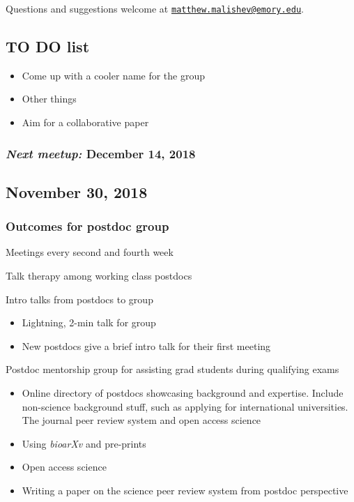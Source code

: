 \documentclass[10,portrait]{article}
\providecommand{\tightlist}{%
  \setlength{\itemsep}{0pt}\setlength{\parskip}{0pt}}
\begin{document}
Questions and suggestions welcome at
\href{mailto:matthew.malishev@emory.edu}{\nolinkurl{matthew.malishev@emory.edu}}.

\newpage  

\subsection{TO DO list}\label{to-do-list}

\begin{itemize}
\tightlist
\item
  Come up with a cooler name for the group\\
\item
  Other things\\
\item
  Aim for a collaborative paper
\end{itemize}

\subsubsection{\texorpdfstring{\emph{Next meetup:} December 14,
2018}{Next meetup: December 14, 2018}}\label{next-meetup-december-14-2018}

\newpage  

\subsection{November 30, 2018}\label{november-30-2018}

\subsubsection{Outcomes for postdoc
group}\label{outcomes-for-postdoc-group}

Meetings every second and fourth week

Talk therapy among working class postdocs

Intro talks from postdocs to group

\begin{itemize}
\item
  Lightning, 2-min talk for group
\item
  New postdocs give a brief intro talk for their first meeting
\end{itemize}

Postdoc mentorship group for assisting grad students during qualifying
exams

\begin{itemize}
\item
  Online directory of postdocs showcasing background and expertise.
  Include non-science background stuff, such as applying for
  international universities.\\
  The journal peer review system and open access science
\item
  Using \emph{bioarXv} and pre-prints\\
\item
  Open access science\\
\item
  Writing a paper on the science peer review system from postdoc
  perspective
\end{itemize}
\end{document}

